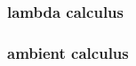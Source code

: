 \documentclass{article}
\begin{document}



\subsubsection*{lambda calculus}


\subsubsection*{ambient calculus}



\end{document}
